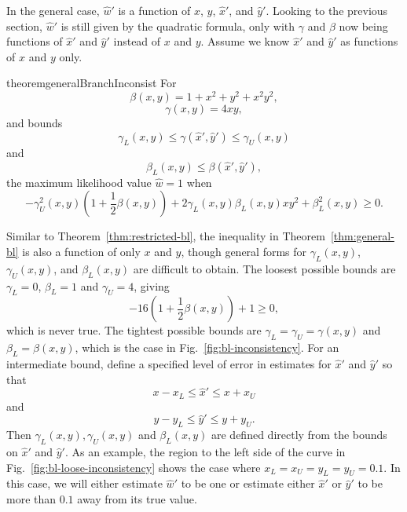 \documentclass{article}
\begin{document}
In the general case, $\hat{w}'$ is a function of $x$, $y$, $\hat{x}'$, and $\hat{y}'$.
Looking to the previous section, $\hat{w}'$ is still given by the quadratic formula, only with $\gamma$ and $\beta$ now being functions of $\hat{x}'$ and $\hat{y}'$ instead of $x$ and $y$.
Assume we know $\hat{x}'$ and $\hat{y}'$ as functions of $x$ and $y$ only.
\begin{restatable}{theorem}{generalBranchInconsist}
\label{thm:general-bl}
For
$$
\beta(x, y) = 1+x^2+y^2+x^2y^2,
$$
$$
\gamma(x, y) = 4xy,
$$
and bounds
$$
\gamma_{L}(x, y) \le \gamma(\hat{x}', \hat{y}') \le \gamma_{U}(x, y)
$$
and
$$
\beta_{L}(x, y) \le \beta(\hat{x}', \hat{y}'),
$$
the maximum likelihood value $\hat{w}=1$ when
$$
-\gamma_{U}^2(x, y)\left(1 + \frac{1}{2}\beta(x, y)\right) + 2\gamma_{L}(x, y)\beta_{L}(x, y)xy^2 + \beta_{L}^2(x, y) \ge 0.
$$
\end{restatable}
Similar to Theorem~\ref{thm:restricted-bl}, the inequality in Theorem~\ref{thm:general-bl} is also a function of only $x$ and $y$, though general forms for $\gamma_L(x, y)$, $\gamma_U(x, y)$, and $\beta_L(x, y)$ are difficult to obtain.
The loosest possible bounds are $\gamma_{L} = 0$, $\beta_{L} = 1$ and $\gamma_{U} = 4$, giving
$$
-16\left(1 + \frac{1}{2}\beta(x, y)\right) + 1 \ge 0,
$$
which is never true.
The tightest possible bounds are $\gamma_{L} = \gamma_{U} = \gamma(x, y)$ and $\beta_{L} = \beta(x, y)$, which is the case in Fig.~\ref{fig:bl-inconsistency}.
For an intermediate bound, define a specified level of error in estimates for $\hat{x}'$ and $\hat{y}'$ so that
$$
x-x_{L} \le \hat{x}' \le x+x_{U}
$$
and
$$
y-y_{L} \le \hat{y}' \le y+y_{U}.
$$
Then $\gamma_L(x, y), \gamma_U(x, y)$ and $\beta_L(x, y)$ are defined directly from the bounds on $\hat{x}'$ and $\hat{y}'$.
As an example, the region to the left side of the curve in Fig.~\ref{fig:bl-loose-inconsistency} shows the case where $x_L=x_U=y_L=y_U=0.1$.
In this case, we will either estimate $\hat{w}'$ to be one or estimate either $\hat{x}'$ or $\hat{y}'$ to be more than $0.1$ away from its true value.
\end{document}
